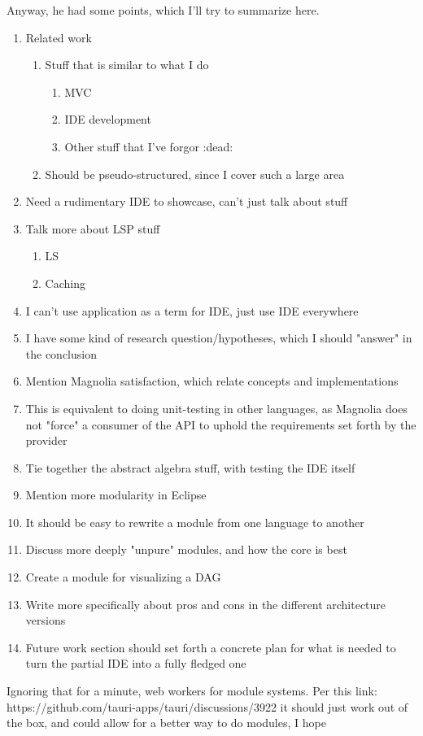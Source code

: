 Anyway, he had some points, which I'll try to summarize here.

\begin{enumerate}
  \item Related work
    \begin{enumerate}
      \item Stuff that is similar to what I do
        \begin{enumerate}
          \item MVC
          \item IDE development
          \item Other stuff that I've forgor :dead:
        \end{enumerate}
      \item Should be pseudo-structured, since I cover such a large area
    \end{enumerate}
  \item Need a rudimentary IDE to showcase, can't just talk about stuff
  \item Talk more about LSP stuff
    \begin{enumerate}
      \item LS
      \item Caching
    \end{enumerate}
  \item I can't use application as a term for IDE, just use IDE everywhere
  \item I have some kind of research question/hypotheses, which I should "answer"
    in the conclusion
  \item Mention Magnolia satisfaction, which relate concepts and implementations
  \item This is equivalent to doing unit-testing in other languages, as Magnolia
    does not "force" a consumer of the API to uphold the requirements set forth
    by the provider
  \item Tie together the abstract algebra stuff, with testing the IDE itself
  \item Mention more modularity in Eclipse
  \item It should be easy to rewrite a module from one language to another
  \item Discuss more deeply "unpure" modules, and how the core is best
  \item Create a module for visualizing a DAG
  \item Write more specifically about pros and cons in the different
    architecture versions
  \item Future work section should set forth a concrete plan for what is needed
    to turn the partial IDE into a fully fledged one
\end{enumerate}

Ignoring that for a minute, web workers for module systems. Per this link:
https://github.com/tauri-apps/tauri/discussions/3922
it should just work out of the box, and could allow for a better way to do
modules, I hope
